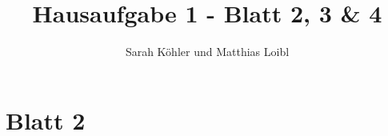 \documentclass[12pt]{amsart}
\title{Hausaufgabe 1 - Blatt 2, 3 \& 4}
\author{Sarah Köhler und Matthias Loibl}
\date{} %
\begin{document}
\maketitle

\section*{Blatt 2}



%



\end{document}
